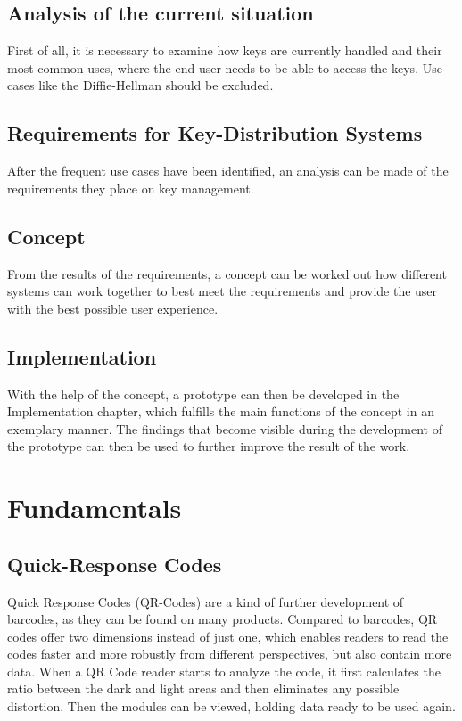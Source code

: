 \documentclass[12pt,oneside,a4paper,parskip]{scrbook}
\begin{document}
\section{Analysis of the current situation}

First of all, it is necessary to examine how keys are currently handled and their most common uses, where the end user needs to be able to access the keys. Use cases like the Diffie-Hellman should be excluded. 

\section{Requirements for Key-Distribution Systems}

After the frequent use cases have been identified, an analysis can be made of the requirements they place on key management. 

\section{Concept}

From the results of the requirements, a concept can be worked out how different systems can work together to best meet the requirements and provide the user with the best possible user experience. 

\section{Implementation}

With the help of the concept, a prototype can then be developed in the Implementation chapter, which fulfills the main functions of the concept in an exemplary manner. The findings that become visible during the development of the prototype can then be used to further improve the result of the work.


\chapter{Fundamentals}

\section{Quick-Response Codes}

Quick Response Codes (QR-Codes) are a kind of further development of barcodes, as they can be found on many products. Compared to barcodes, QR codes offer two dimensions instead of just one, which enables readers to read the codes faster and more robustly from different perspectives, but also contain more data. When a QR Code reader starts to analyze the code, it first calculates the ratio between the dark and light areas and then eliminates any possible distortion. Then the modules can be viewed, holding data ready to be used again. \parencite{office_masahiro_1994}
\end{document}
